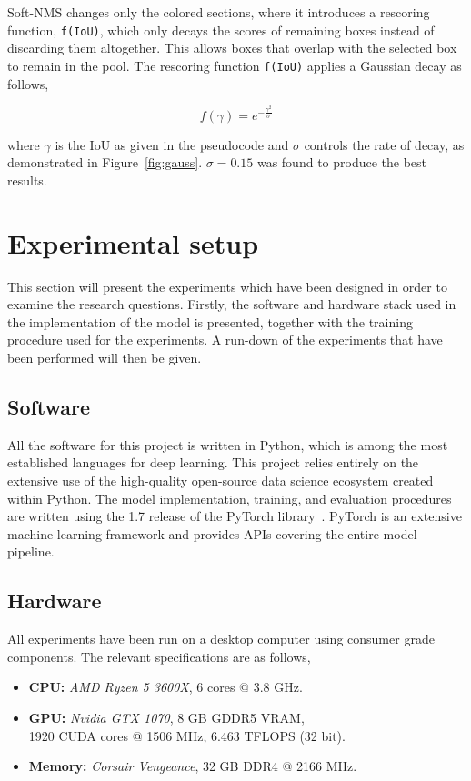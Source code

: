Soft-NMS changes only the colored sections, where it introduces a rescoring function, \texttt{f(IoU)}, which only decays the scores of remaining boxes instead of discarding them altogether. %
This allows boxes that overlap with the selected box to remain in the pool.
The rescoring function \texttt{f(IoU)} applies a Gaussian decay as follows, %

\[f(\gamma) = e^{-\frac{{\gamma}^2}{\sigma}}\]

where \(\gamma \) is the IoU as given in the pseudocode and \( \sigma \) controls the rate of decay, as demonstrated in Figure~\ref{fig:gauss}. \(\sigma=0.15\) was found to produce the best results.

\section{Experimental setup}\label{sec:method-exp-setup}
This section will present the experiments which have been designed in order to examine the research questions.
Firstly, the software and hardware stack used in the implementation of the model is presented, together with the training procedure used for the experiments.
A run-down of the experiments that have been performed will then be given.

\subsection{Software}
All the software for this project is written in Python, which is among the most established languages for deep learning.
This project relies entirely on the extensive use of the high-quality open-source data science ecosystem created within Python.
The model implementation, training, and evaluation procedures are written using the 1.7 release of the PyTorch library\ \parencite{NEURIPS2019_9015}.
PyTorch is an extensive machine learning framework and provides APIs covering the entire model pipeline.

\subsection{Hardware}
All experiments have been run on a desktop computer using consumer grade components.
The relevant specifications are as follows,

\begin{itemize}
  \item \textbf{CPU:} \textit{AMD Ryzen 5 3600X}, 6 cores @ 3.8 GHz.
  \item \textbf{GPU:} \textit{Nvidia GTX 1070}, 8 GB GDDR5 VRAM,\\1920 CUDA cores @ 1506 MHz, 6.463 TFLOPS (32 bit).
  \item \textbf{Memory:} \textit{Corsair Vengeance}, 32 GB DDR4 @ 2166 MHz.
\end{itemize}

